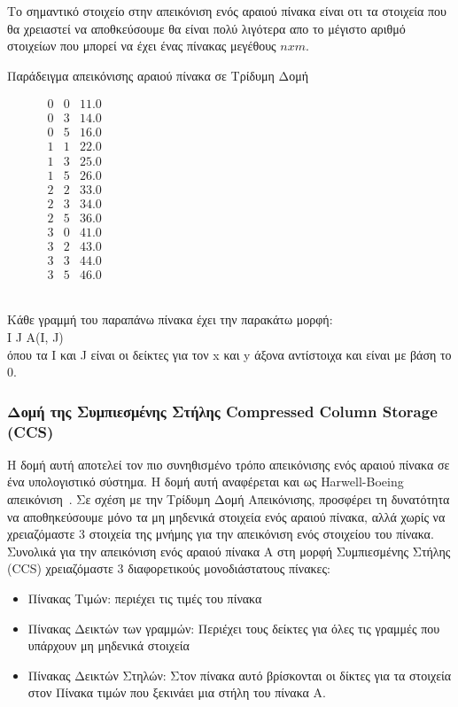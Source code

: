 Το σημαντικό στοιχείο στην απεικόνιση ενός αραιού πίνακα είναι οτι τα στοιχεία που θα χρειαστεί να αποθκεύσουμε θα είναι πολύ λιγότερα απο το μέγιστο αριθμό στοιχείων που μπορεί να έχει ένας πίνακας μεγέθους $n x m$.


Παράδειγμα απεικόνισης αραιού πίνακα σε Τρίδυμη Δομή\\

\begin{figure}[ht]
\centering
$\begin{matrix}
0 & 0 & 11.0\\
0 & 3 & 14.0\\
0 & 5 & 16.0\\
1 & 1 & 22.0\\
1 & 3 & 25.0\\
1 & 5 & 26.0\\
2 & 2 & 33.0\\
2 & 3 & 34.0\\
2 & 5 & 36.0\\
3 & 0 & 41.0\\
3 & 2 & 43.0\\
3 & 3 & 44.0\\
3 & 5 & 46.0
\end{matrix}$
\end{figure}

\\
Κάθε γραμμή του παραπάνω πίνακα έχει την παρακάτω μορφή:\\
\textlatin{I J A(I, J)}\\
όπου τα \textlatin{I} και \textlatin{J} είναι οι δείκτες για τον \textlatin{x} και \textlatin{y} άξονα αντίστοιχα και είναι με βάση το 0.

\subsubsection{Δομή της Συμπιεσμένης Στήλης \textlatin{Compressed Column Storage (CCS)}} \label{CCS}
Η δομή αυτή αποτελεί τον πιο συνηθισμένο τρόπο απεικόνισης ενός αραιού πίνακα σε ένα υπολογιστικό σύστημα. Η δομή αυτή αναφέρεται και ως \textlatin{Harwell-Boeing} απεικόνιση~\cite{duff1989sparse}. Σε σχέση με την Τρίδυμη Δομή Απεικόνισης, προσφέρει τη δυνατότητα να αποθηκεύσουμε μόνο τα μη μηδενικά στοιχεία ενός αραιού πίνακα, αλλά χωρίς να χρειαζόμαστε 3 στοιχεία της μνήμης για την απεικόνιση ενός στοιχείου του πίνακα.
Συνολικά για την απεικόνιση ενός αραιού πίνακα Α στη μορφή Συμπιεσμένης Στήλης \textlatin{(CCS)} χρειαζόμαστε 3 διαφορετικούς μονοδιάστατους πίνακες:
\begin{itemize}
  \item Πίνακας Τιμών: περιέχει τις τιμές του πίνακα
  \item Πίνακας Δεικτών των γραμμών: Περιέχει τους δείκτες για όλες τις γραμμές που υπάρχουν μη μηδενικά στοιχεία
  \item Πίνακας Δεικτών Στηλών: Στον πίνακα αυτό βρίσκονται οι δίκτες για τα στοιχεία στον Πίνακα τιμών που ξεκινάει μια στήλη του πίνακα Α. 
\end{itemize}

